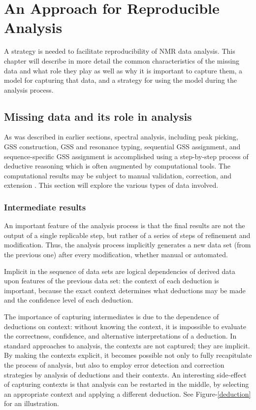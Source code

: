 \chapter{An Approach for Reproducible Analysis}

A strategy is needed to facilitate reproducibility of NMR data analysis.
This chapter will describe in more detail the common characteristics of
the missing data and what role they play as well as why it is important to
capture them, a model for capturing that data, and a strategy for using
the model during the analysis process.


\section{Missing data and its role in analysis}

As was described in earlier sections, 
spectral analysis, including peak picking, GSS construction, GSS and resonance
typing, sequential GSS assignment, and sequence-specific GSS assignment is 
accomplished using a step-by-step process of deductive reasoning 
which is often augmented by computational tools.  The computational 
results may be subject to manual validation, correction, and extension
\cite{guerry2011automated}.  This section will explore the various types
of data involved.

\subsection{Intermediate results}

An important feature of the analysis process is that the final results are
not the output of a single replicable step, but rather of a series of steps
of refinement and modification.  Thus, the analysis process implicitly 
generates a new data set (from the previous one) after every modification, 
whether manual or automated.

Implicit in the sequence of data sets are logical dependencies of derived
data upon features of the previous data set: the context of each deduction
is important, because the exact context determines what deductions may be
made and the confidence level of each deduction. %

The importance of capturing intermediates is due to the dependence of 
deductions on context: without knowing the context, it is impossible to 
evaluate the correctness, confidence, and alternative interpretations of
a deduction.  In standard approaches to analysis, the contexts are not
captured; they are implicit.  By making the contexts explicit, it becomes
possible not only to fully recapitulate the process of analysis, but also 
to employ error detection and correction strategies by analysis
of deductions and their contexts.  
An interesting side-effect of capturing
contexts is that analysis can be restarted in the middle, by selecting an
appropriate context and applying a different deduction.
See Figure-\ref{deduction} for an illustration.

